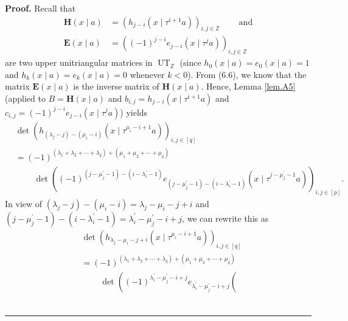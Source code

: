 \documentclass[numbers=enddot,12pt,final,onecolumn,notitlepage]{scrartcl}%
\theoremstyle{definition}
\newenvironment{proof}[1][Proof]{\noindent\textbf{#1.} }{\ \rule{0.5em}{0.5em}}
\begin{document}
\begin{enumerate}
\begin{proof}
Recall that%
\begin{align*}
\mathbf{H}\left(  x\mid a\right)   &  =\left(  h_{j-i}\left(  x\mid\tau
^{i+1}a\right)  \right)  _{i,j\in\mathbb{Z}}\ \ \ \ \ \ \ \ \ \ \text{and}\\
\mathbf{E}\left(  x\mid a\right)   &  =\left(  \left(  -1\right)
^{j-i}e_{j-i}\left(  x\mid\tau^{j}a\right)  \right)  _{i,j\in\mathbb{Z}}%
\end{align*}
are two upper unitriangular matrices in $\operatorname*{UT}%
\nolimits_{\mathbb{Z}}$ (since $h_{0}\left(  x\mid a\right)  =e_{0}\left(
x\mid a\right)  =1$ and $h_{k}\left(  x\mid a\right)  =e_{k}\left(  x\mid
a\right)  =0$ whenever $k<0$). From (6.6), we know that the matrix
$\mathbf{E}\left(  x\mid a\right)  $ is the inverse matrix of $\mathbf{H}%
\left(  x\mid a\right)  $. Hence, Lemma \ref{lem.A5} (applied to
$B=\mathbf{H}\left(  x\mid a\right)  $ and $b_{i,j}=h_{j-i}\left(  x\mid
\tau^{i+1}a\right)  $ and $c_{i,j}=\left(  -1\right)  ^{j-i}e_{j-i}\left(
x\mid\tau^{j}a\right)  $) yields%
\begin{align*}
&  \det\left(  h_{\left(  \lambda_{j}-j\right)  -\left(  \mu_{i}-i\right)
}\left(  x\mid\tau^{\mu_{i}-i+1}a\right)  \right)  _{i,j\in\left[  q\right]
}\\
&  =\left(  -1\right)  ^{\left(  \lambda_{1}+\lambda_{2}+\cdots+\lambda
_{q}\right)  +\left(  \mu_{1}+\mu_{2}+\cdots+\mu_{q}\right)  }\\
&  \ \ \ \ \ \ \ \ \ \ \det\left(  \left(  -1\right)  ^{\left(  j-\mu
_{j}^{\prime}-1\right)  -\left(  i-\lambda_{i}^{\prime}-1\right)  }e_{\left(
j-\mu_{j}^{\prime}-1\right)  -\left(  i-\lambda_{i}^{\prime}-1\right)
}\left(  x\mid\tau^{j-\mu_{j}^{\prime}-1}a\right)  \right)  _{i,j\in\left[
p\right]  }.
\end{align*}
In view of $\left(  \lambda_{j}-j\right)  -\left(  \mu_{i}-i\right)
=\lambda_{j}-\mu_{i}-j+i$ and $\left(  j-\mu_{j}^{\prime}-1\right)  -\left(
i-\lambda_{i}^{\prime}-1\right)  =\lambda_{i}^{\prime}-\mu_{j}^{\prime}-i+j$,
we can rewrite this as%
\begin{align*}
&  \det\left(  h_{\lambda_{j}-\mu_{i}-j+i}\left(  x\mid\tau^{\mu_{i}%
-i+1}a\right)  \right)  _{i,j\in\left[  q\right]  }\\
&  =\left(  -1\right)  ^{\left(  \lambda_{1}+\lambda_{2}+\cdots+\lambda
_{q}\right)  +\left(  \mu_{1}+\mu_{2}+\cdots+\mu_{q}\right)  }\\
&  \ \ \ \ \ \ \ \ \ \ \det\left(  \left(  -1\right)  ^{\lambda_{i}^{\prime
}-\mu_{j}^{\prime}-i+j}e_{\lambda_{i}^{\prime}-\mu_{j}^{\prime}-i+j}\left(

\end{align*}
\end{proof}
\end{enumerate}
\end{document}
